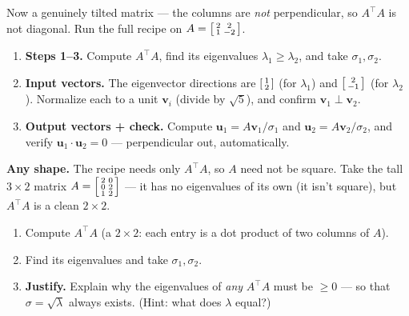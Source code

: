 \documentclass[10pt]{article}
\newcommand{\uu}{\mathbf{u}}
\newcommand{\vv}{\mathbf{v}}
\newcommand{\T}{^{\top}}
\begin{document}
\begin{tcolorbox}[colback=white, colframe=black!40, title=\textbf{Tier A --- Approaching Proficiency},
    fonttitle=\bfseries, arc=1.5mm, left=3mm, right=3mm, top=2mm, bottom=2mm, breakable]
Now a genuinely tilted matrix --- the columns are \emph{not} perpendicular, so $A\T A$ is not diagonal.
Run the full recipe on $A=\begin{bsmallmatrix} 2 & 2\\ 1 & -2 \end{bsmallmatrix}$.
\begin{enumerate}[leftmargin=1.7em, itemsep=9pt]
  \item \textbf{Steps 1--3.} Compute $A\T A$, find its eigenvalues $\lambda_1\ge\lambda_2$, and take
        $\sigma_1,\sigma_2$. 
  \item \textbf{Input vectors.} The eigenvector directions are $\begin{bsmallmatrix} 1\\ 2 \end{bsmallmatrix}$
        (for $\lambda_1$) and $\begin{bsmallmatrix} 2\\ -1 \end{bsmallmatrix}$ (for $\lambda_2$). Normalize
        each to a unit $\vv_i$ (divide by $\sqrt5$), and confirm $\vv_1\perp\vv_2$. \writeline
  \item \textbf{Output vectors + check.} Compute $\uu_1=A\vv_1/\sigma_1$ and $\uu_2=A\vv_2/\sigma_2$, and
        verify $\uu_1\cdot\uu_2=0$ --- perpendicular out, automatically. 
\end{enumerate}
\end{tcolorbox}

\begin{tcolorbox}[colback=white, colframe=black!40, title=\textbf{Tier E --- Extension},
    fonttitle=\bfseries, arc=1.5mm, left=3mm, right=3mm, top=2mm, bottom=2mm, breakable]
\textbf{Any shape.} The recipe needs only $A\T A$, so $A$ need not be square. Take the tall
$3\times2$ matrix $A=\begin{bsmallmatrix} 2 & 0\\ 0 & 2\\ 1 & 2 \end{bsmallmatrix}$ --- it has no
eigenvalues of its own (it isn't square), but $A\T A$ is a clean $2\times2$.
\begin{enumerate}[leftmargin=1.7em, itemsep=9pt]
  \item Compute $A\T A$ (a $2\times2$: each entry is a dot product of two columns of $A$). 
  \item Find its eigenvalues and take $\sigma_1,\sigma_2$. \writeline
  \item \textbf{Justify.} Explain why the eigenvalues of \emph{any} $A\T A$ must be $\ge0$ --- so that
        $\sigma=\sqrt{\lambda}$ always exists. (Hint: what does $\lambda$ equal?) \writeline
\end{enumerate}
\end{tcolorbox}
\end{document}
